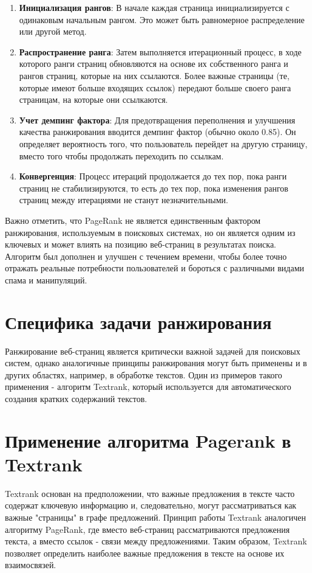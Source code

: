 \documentclass[a4paper]{article}
\begin{document}
\begin{enumerate}
	\item \textbf{Инициализация рангов}: В начале каждая страница инициализируется с одинаковым начальным рангом. Это может быть равномерное распределение или другой метод.
	\item \textbf{Распространение ранга}: Затем выполняется итерационный процесс, в ходе которого ранги страниц обновляются на основе их собственного ранга и рангов страниц, которые на них ссылаются. Более важные страницы (те, которые имеют больше входящих ссылок) передают больше своего ранга страницам, на которые они ссылкаются.
	\item \textbf{Учет демпинг фактора}: Для предотвращения переполнения и улучшения качества ранжирования вводится демпинг фактор (обычно около 0.85). Он определяет вероятность того, что пользователь перейдет на другую страницу, вместо того чтобы продолжать переходить по ссылкам.
	\item \textbf{Конвергенция}: Процесс итераций продолжается до тех пор, пока ранги страниц не стабилизируются, то есть до тех пор, пока изменения рангов страниц между итерациями не станут незначительными.
\end{enumerate}

Важно отметить, что PageRank не является единственным фактором ранжирования, используемым в поисковых системах, но он является одним из ключевых и может влиять на позицию веб-страниц в результатах поиска. Алгоритм был дополнен и улучшен с течением времени, чтобы более точно отражать реальные потребности пользователей и бороться с различными видами спама и манипуляций.

	
\section{Специфика задачи ранжирования}

Ранжирование веб-страниц является критически важной задачей для поисковых систем, однако аналогичные принципы ранжирования могут быть применены и в других областях, например, в обработке текстов. Один из примеров такого применения - алгоритм Textrank, который используется для автоматического создания кратких содержаний текстов.

\section{Применение алгоритма Pagerank в Textrank}

Textrank основан на предположении, что важные предложения в тексте часто содержат ключевую информацию и, следовательно, могут рассматриваться как важные "страницы" в графе предложений. Принцип работы Textrank аналогичен алгоритму PageRank, где вместо веб-страниц рассматриваются предложения текста, а вместо ссылок - связи между предложениями. Таким образом, Textrank позволяет определить наиболее важные предложения в тексте на основе их взаимосвязей.
\end{document}
